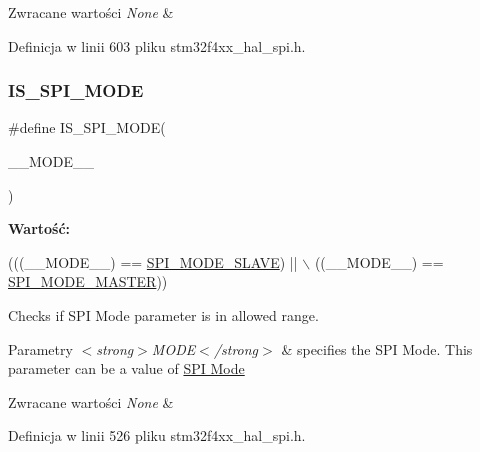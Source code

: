 \begin{DoxyRetVals}{Zwracane wartości}
{\em None} & \\
\hline
\end{DoxyRetVals}


Definicja w linii 603 pliku stm32f4xx\+\_\+hal\+\_\+spi.\+h.

\mbox{\label{group___s_p_i___private___macros_ga3dd95189a3729f12ca354b757519ca01}} 
\subsubsection{\texorpdfstring{I\+S\+\_\+\+S\+P\+I\+\_\+\+M\+O\+DE}{IS\_SPI\_MODE}}
{\footnotesize\ttfamily \#define I\+S\+\_\+\+S\+P\+I\+\_\+\+M\+O\+DE(\begin{DoxyParamCaption}\item[{}]{\+\_\+\+\_\+\+M\+O\+D\+E\+\_\+\+\_\+ }\end{DoxyParamCaption})}

{\bfseries Wartość\+:}
\begin{DoxyCode}
(((\_\_MODE\_\_) == \hyperlink{group___s_p_i___mode_ga75f094fee5a9dc10b88401ccd17925d3}{SPI\_MODE\_SLAVE}) || \(\backslash\)
                               ((\_\_MODE\_\_) == \hyperlink{group___s_p_i___mode_gaa335c2abdfad9e6f6c2677719d93b64e}{SPI\_MODE\_MASTER}))
\end{DoxyCode}


Checks if S\+PI Mode parameter is in allowed range. 


\begin{DoxyParams}{Parametry}
{\em $<$strong$>$\+M\+O\+D\+E$<$/strong$>$} & specifies the S\+PI Mode. This parameter can be a value of \hyperlink{group___s_p_i___mode}{S\+PI Mode} \\
\hline
\end{DoxyParams}

\begin{DoxyRetVals}{Zwracane wartości}
{\em None} & \\
\hline
\end{DoxyRetVals}


Definicja w linii 526 pliku stm32f4xx\+\_\+hal\+\_\+spi.\+h.

\mbox{\label{group___s_p_i___private___macros_ga7e90530e595a47ab465e3e222014f5e3}} 
